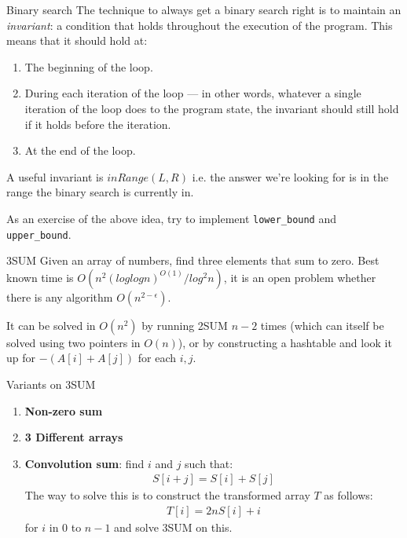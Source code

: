 \documentclass[titlepage, 12pt]{book}
\begin{document}
\begin{algorithm}{Binary search}{}
    The technique to always get a binary search right is to maintain an
    \textit{invariant}: a condition that holds throughout the execution of the
    program. This means that it should hold at:
    \begin{enumerate}
        \item The beginning of the loop.
        \item During each iteration of the loop --- in other words, whatever
            a single iteration of the loop does to the program state, the
            invariant should still hold if it holds before the iteration.
        \item At the end of the loop.
    \end{enumerate}
    A useful invariant is $inRange(L, R)$ i.e. the answer we're looking for is
    in the range the binary search is currently in.
\end{algorithm}
As an exercise of the above idea, try to implement \verb|lower_bound| and
\verb|upper_bound|.

\begin{problem}{3SUM}{}
    Given an array of numbers, find three elements that sum to zero. Best known
    time is $O(n^2(loglogn)^{O(1)}/log^2n)$, it is an open problem whether there
    is any algorithm $O(n^{2 - \epsilon})$.
\end{problem}

It can be solved in $O(n^2)$ by running 2SUM $n - 2$ times (which can itself be
solved using two pointers in $O(n)$), or by constructing a hashtable and look it
up for $- (A[i] + A[j])$ for each $i, j$.

Variants on 3SUM

\begin{enumerate}
    \item \textbf{Non-zero sum}
    \item \textbf{3 Different arrays}
    \item \textbf{Convolution sum}: find $i$ and $j$ such that:
        \begin{align*}
            S[i + j] = S[i] + S[j]
        \end{align*}
        The way to solve this is to construct the transformed array $T$ as
        follows:
        \begin{align*}
            T[i] = 2nS[i] + i
        \end{align*}
        for $i$ in 0 to $n - 1$ and solve 3SUM on this.
\end{enumerate}
\end{document}
